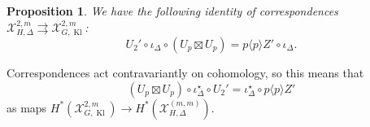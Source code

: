 \documentclass[cjm]{ipart}
\theoremstyle{plain}
\newtheorem{proposition}[theorem]{Proposition}
\theoremstyle{remark}
\DeclareMathOperator{\Kl}{Kl}
\newcommand{\cX}{\mathcal{X}}
\numberwithin{equation}{subsection}
\begin{document}
  \begin{proposition}\label{prop:weirdcorresp}
    We have the following identity of correspondences $\cX_{H, \Delta}^{2,m} \rightrightarrows \cX_{G, \Kl}^{2,m}$:
    \begin{equation}\label{eq:weirdeqn}
      U_2' \circ \iota_\Delta \circ (U_p \boxtimes U_p) = p\langle p \rangle Z' \circ \iota_\Delta.
     \end{equation}
   \end{proposition}

  \begin{note}
    Correspondences act contravariantly on cohomology, so this means that
    \[ (U_p \boxtimes U_p) \circ \iota_\Delta^\star \circ U_2' = \iota_\Delta^\star \circ p\langle p\rangle Z'\]
    as maps $H^*(\cX_{G, \Kl}^{2,m}) \to H^*(\cX_{H, \Delta}^{(m,m)})$.
   \end{note}
\end{document}
